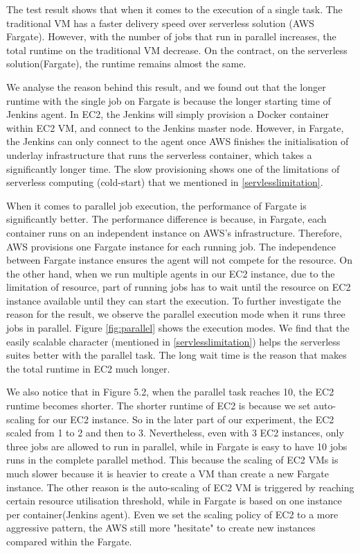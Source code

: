 \par
The test result shows that when it comes to the execution of a single task. The traditional VM has a faster delivery speed over serverless solution (AWS Fargate). However, with the number of jobs that run in parallel increases, the total runtime on the traditional VM decrease. On the contract, on the serverless solution(Fargate), the runtime remains almost the same.
\par
We analyse the reason behind this result, and we found out that the longer runtime with the single job on Fargate is because the longer starting time of Jenkins agent. In EC2, the Jenkins will simply provision a Docker container within EC2 VM, and connect to the Jenkins master node. However, in Fargate, the Jenkins can only connect to the agent once AWS finishes the initialisation of underlay infrastructure that runs the serverless container, which takes a significantly longer time. The slow provisioning shows one of the limitations of serverless computing (cold-start) that we mentioned in \ref{servlesslimitation}.
\par
When it comes to parallel job execution, the performance of Fargate is significantly better. The performance difference is because, in Fargate, each container runs on an independent instance on AWS's infrastructure. Therefore, AWS provisions one Fargate instance for each running job. The independence between Fargate instance ensures the agent will not compete for the resource. On the other hand, when we run multiple agents in our EC2 instance, due to the limitation of resource, part of running jobs has to wait until the resource on EC2 instance available until they can start the execution. To further investigate the reason for the result, we observe the parallel execution mode when it runs three jobs in parallel. Figure \ref{fig:parallel} shows the execution modes. We find that the easily scalable character (mentioned in \ref{servlesslimitation}) helps the serverless suites better with the parallel task. The long wait time is the reason that makes the total runtime in EC2 much longer.
\par
We also notice that in Figure 5.2, when the parallel task reaches 10, the EC2 runtime becomes shorter. The shorter runtime of EC2 is because we set auto-scaling for our EC2 instance. So in the later part of our experiment, the EC2 scaled from 1 to 2 and then to 3. Nevertheless, even with 3 EC2 instances, only three jobs are allowed to run in parallel, while in Fargate is easy to have 10 jobs runs in the complete parallel method. This because the scaling of EC2 VMs is much slower because it is heavier to create a VM than create a new Fargate instance. The other reason is the auto-scaling of EC2 VM is triggered by reaching certain resource utilisation threshold, while in Fargate is based on one instance per container(Jenkins agent). Even we set the scaling policy of EC2 to a more aggressive pattern, the AWS still more "hesitate" to create new instances compared within the Fargate.
